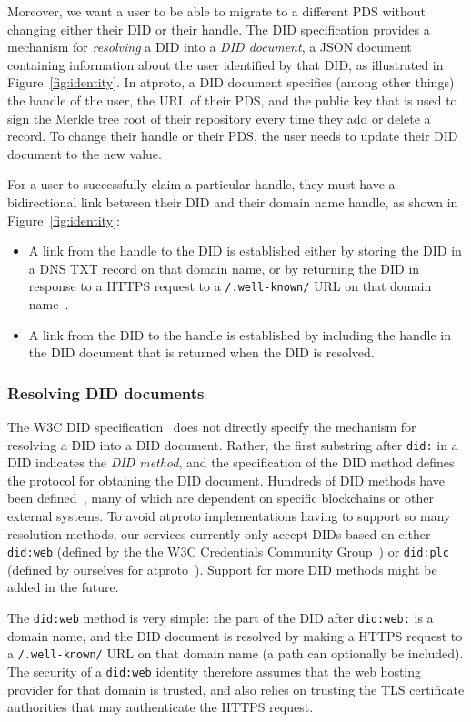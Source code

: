 \documentclass[sigconf,review]{acmart}
\begin{document}
Moreover, we want a user to be able to migrate to a different PDS without changing either their DID or their handle.
The DID specification provides a mechanism for \emph{resolving} a DID into a \emph{DID document}, a JSON document containing information about the user identified by that DID, as illustrated in Figure~\ref{fig:identity}.
In atproto, a DID document specifies (among other things) the handle of the user, the URL of their PDS, and the public key that is used to sign the Merkle tree root of their repository every time they add or delete a record.
To change their handle or their PDS, the user needs to update their DID document to the new value.

For a user to successfully claim a particular handle, they must have a bidirectional link between their DID and their domain name handle, as shown in Figure~\ref{fig:identity}:
\begin{itemize}
    \item A link from the handle to the DID is established either by storing the DID in a DNS TXT record on that domain name, or by returning the DID in response to a HTTPS request to a \texttt{/.well-known/} URL on that domain name~\cite{DomainHandle}.
    \item A link from the DID to the handle is established by including the handle in the DID document that is returned when the DID is resolved.
\end{itemize}

\subsubsection{Resolving DID documents}

The W3C DID specification~\cite{DIDCore} does not directly specify the mechanism for resolving a DID into a DID document.
Rather, the first substring after \texttt{did:} in a DID indicates the \emph{DID method}, and the specification of the DID method defines the protocol for obtaining the DID document.
Hundreds of DID methods have been defined~\cite{DIDMethods}, many of which are dependent on specific blockchains or other external systems.
To avoid atproto implementations having to support so many resolution methods, our services currently only accept DIDs based on either \texttt{did:web} (defined by the the W3C Credentials Community Group~\cite{did:web}) or \texttt{did:plc} (defined by ourselves for atproto~\cite{did:plc}).
Support for more DID methods might be added in the future.

The \texttt{did:web} method is very simple: the part of the DID after \texttt{did:web:} is a domain name, and the DID document is resolved by making a HTTPS request to a \texttt{/.well-known/} URL on that domain name (a path can optionally be included).
The security of a \texttt{did:web} identity therefore assumes that the web hosting provider for that domain is trusted, and also relies on trusting the TLS certificate authorities that may authenticate the HTTPS request.
\end{document}
